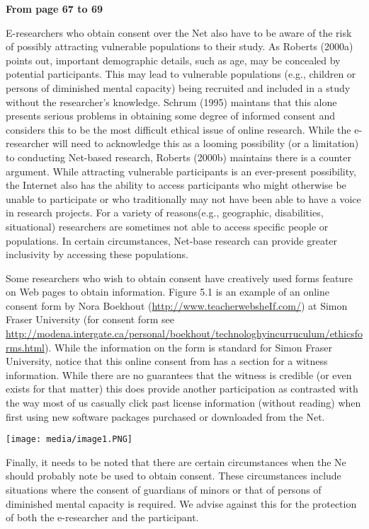 \documentclass[]{article}
\date{}
\begin{document}
\textbf{From page 67 to 69}

E-researchers who obtain consent over the Net also have to be aware of
the risk of possibly attracting vulnerable populations to their study.
As Roberts (2000a) points out, important demographic details, such as
age, may be concealed by potential participants. This may lead to
vulnerable populations (e.g., children or persons of diminished mental
capacity) being recruited and included in a study without the
researcher's knowledge. Schrum (1995) maintans that this alone presents
serious problems in obtaining some degree of informed consent and
considers this to be the most difficult ethical issue of online
research. While the e-researcher will need to acknowledge this as a
looming possibility (or a limitation) to conducting Net-based research,
Roberts (2000b) maintains there is a counter argument. While attracting
vulnerable participants is an ever-present possibility, the Internet
also has the ability to access participants who might otherwise be
unable to participate or who traditionally may not have been able to
have a voice in research projects. For a variety of reasons(e.g.,
geographic, disabilities, situational) researchers are sometimes not
able to access specific people or populations. In certain circumstances,
Net-base research can provide greater inclusivity by accessing these
populations.

Some researchers who wish to obtain consent have creatively used forms
feature on Web pages to obtain information. Figure 5.1 is an example of
an online consent form by Nora Boekhout
(\url{http://www.teacherwebsheIf.com/}) at Simon Fraser University (for
consent form see
\url{http://modena.intergate.ca/personal/boekhout/technologhyincurruculum/ethicsforms.html}).
While the information on the form is standard for Simon Fraser
University, notice that this online consent from has a section for a
witness information. While there are no guarantees that the witness is
credible (or even exists for that matter) this does provide another
participation as contrasted with the way most of us casually click past
license information (without reading) when first using new software
packages purchased or downloaded from the Net.

\texttt{[image: media/image1.PNG]}

Finally, it needs to be noted that there are certain circumstances when
the \textbar{}Ne should probably note be used to obtain consent. These
circumstances include situations where the consent of guardians of
minors or that of persons of diminished mental capacity is required. We
advise against this for the protection of both the e-researcher and the
participant.
\end{document}
